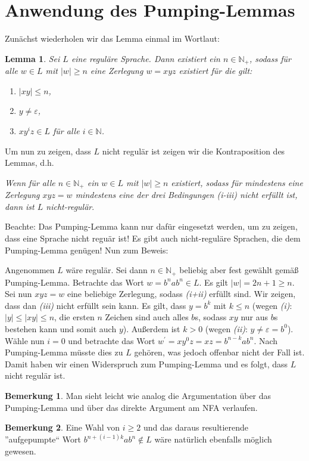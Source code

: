 \documentclass[11pt, a4paper]{article}
\theoremstyle{definition}
\newtheorem*{remark*}{Bemerkung}
\theoremstyle{plain}
\newtheorem*{lemma*}{Lemma}
\begin{document}
\section*{Anwendung des Pumping-Lemmas}
Zunächst wiederholen wir das Lemma einmal im Wortlaut:
\begin{lemma*}
	Sei $L$ eine reguläre Sprache. Dann existiert ein $n \in \mathbb{N}_+$, sodass für alle $w \in L$ mit $\left| w \right| \geq n$ eine Zerlegung $w = xyz$ existiert für die gilt:
	\begin{enumerate}
		\item $\left| xy \right| \leq n$,
		\item $y \neq \varepsilon$,
		\item $xy^i z \in L$ für alle $i \in \mathbb{N}$.
	\end{enumerate}
\end{lemma*}
Um nun zu zeigen, dass $L$ nicht regulär ist zeigen wir die Kontraposition des Lemmas, d.h.
\begin{center}
	\textit{Wenn für alle $n \in \mathbb{N}_+$ ein $w \in L$ mit $\left| w \right| \geq n$ existiert, sodass für mindestens eine Zerlegung $xyz = w$ mindestens eine der drei Bedingungen (i-iii) nicht erfüllt ist, dann ist $L$ nicht-regulär}.
\end{center}
Beachte: Das Pumping-Lemma kann nur dafür eingesetzt werden, um zu zeigen, dass eine Sprache nicht reguär ist! Es gibt auch nicht-reguläre Sprachen, die dem Pumping-Lemma genügen! Nun zum Beweis:\par
Angenommen $L$ wäre regulär. Sei dann $n \in \mathbb{N}_+$ beliebig aber fest gewählt gemäß Pumping-Lemma. Betrachte das Wort $w = b^n a b^n \in L$. Es gilt $\left| w \right| = 2n+1 \geq n$. Sei nun $xyz = w$ eine beliebige Zerlegung, sodass \textit{(i+ii)} erfüllt sind. Wir zeigen, dass dan \textit{(iii)} nicht erfüllt sein kann. Es gilt, dass $y = b^k$ mit $k \leq n$ (wegen \textit{(i)}: $\left| y \right| \leq \left| xy \right| \leq n$, die ersten $n$ Zeichen sind auch alles $b$s, sodass $xy$ nur aus $b$s bestehen kann und somit auch $y$). Außerdem ist $k > 0$ (wegen \textit{(ii)}: $y \neq \varepsilon = b^0$). Wähle nun $i = 0$ und betrachte das Wort $w^\prime = xy^0z = xz = b^{n-k} a b^n$. Nach Pumping-Lemma müsste dies zu $L$ gehören, was jedoch offenbar nicht der Fall ist. Damit haben wir einen Widerspruch zum Pumping-Lemma und es folgt, dass $L$ nicht regulär ist.

\begin{remark*}
	Man sieht leicht wie analog die Argumentation über das Pumping-Lemma und über das direkte Argument am NFA verlaufen.
\end{remark*}
\begin{remark*}
	Eine Wahl von $i \geq 2$ und das daraus resultierende ''aufgepumpte`` Wort $b^{n+(i-1)k} a b^n \notin L$ wäre natürlich ebenfalls möglich gewesen.
\end{remark*}
\end{document}
